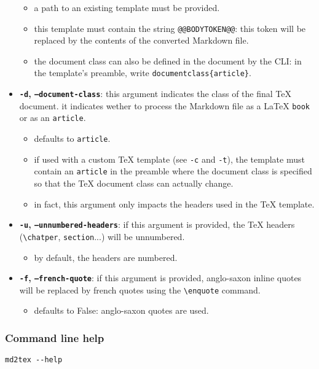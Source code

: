 \documentclass[a4paper, 12pt, twoside]{article}
\begin{document}
\begin{itemize}
\begin{itemize}
\item a path to an existing template must be provided.
\item this template must contain the string \texttt{@@BODYTOKEN@@}: this token will be replaced by the contents of the 	 converted Markdown file.
\item the document class can also be defined in the document by the CLI: 	 in the template's preamble, write \texttt{documentclass\{article\}}.
\end{itemize}
\item \textbf{\texttt{-d}, \texttt{--document-class}}: this argument indicates the class of the final TeX document. it indicates wether to process the Markdown file as a LaTeX \texttt{book} or as an \texttt{article}.
\begin{itemize} 
 \item defaults to \texttt{article}.
\item if used with a custom TeX template (see \texttt{-c} and \texttt{-t}), the template must contain an \texttt{article} 	 in the preamble where the document class is specified so that the TeX document class can actually change.
\item in fact, this argument only impacts the headers used in the TeX template.
\end{itemize}
\item \textbf{\texttt{-u}, \texttt{--unnumbered-headers}}: if this argument is provided, the TeX headers (\texttt{\textbackslash{}chatper}, \texttt{section}...) will be unnumbered.
\begin{itemize} 
 \item by default, the headers are numbered.
\end{itemize}
\item \textbf{\texttt{-f}, \texttt{--french-quote}}: if this argument is provided, anglo-saxon inline quotes will be replaced by french quotes using the \texttt{\textbackslash{}enquote} command.
\begin{itemize} 
 \item defaults to False: anglo-saxon quotes are used. 
\end{itemize}
\end{itemize}
\subsubsection{Command line help}

\begin{listing}[h!]
   \begin{verbatim}
md2tex --help

   \end{verbatim}
\end{listing}
\end{document}
